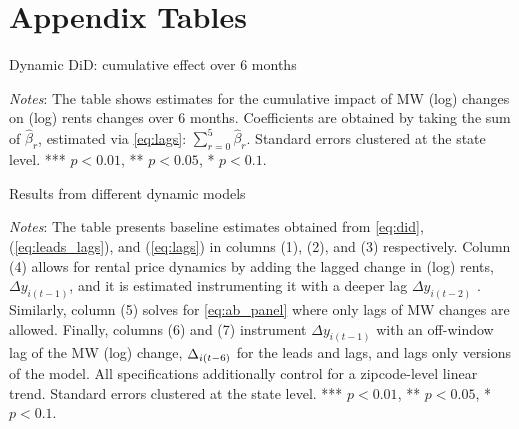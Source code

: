 
\section{Appendix Tables}

\begin{table}[h!]
	\caption{Dynamic DiD: cumulative effect over 6 months}
	\label{tab:dynamic_cumulative}
	\centering
	\resizebox{0.7\textwidth}{!}{
		\vspace{0pt}    
		
	}
	\begin{minipage}{.95\textwidth} \footnotesize
		\vspace{3mm} 
		\textit{Notes}: The table shows estimates for the cumulative impact of MW (log) changes 
		on (log) rents changes over 6 months. Coefficients are obtained by taking the sum of 
		$\hat{\beta}_{r}$, estimated via \autoref{eq:lags}: $\sum\limits_{r=0}^{5} \hat{\beta}_{r}$. 
		Standard errors clustered at the state level. *** $p < 0.01$, ** $p < 0.05$, * $p < 0.1$.   
	\end{minipage}
\end{table}

\clearpage
\begin{landscape}
	\begin{table}[h!]
	    \caption{Results from different dynamic models}
	    \label{tab:horse_race_main}
	    \centering
	    \resizebox{1.2\textwidth}{!}{
		    \vspace{0pt}    
		    
	    }
	    \begin{minipage}{1.15\textwidth} \footnotesize
			\vspace{3mm} 
			\textit{Notes}: The table presents baseline estimates obtained from \autoref{eq:did}, 
			(\ref{eq:leads_lags}), and (\ref{eq:lags}) in columns (1), (2), and (3) respectively. 
			Column (4) allows for rental price dynamics by adding the lagged change in (log) rents, 
			$\Delta y_{i(t-1)}$, and it is estimated instrumenting it with a deeper lag $\Delta 
			y_{i(t-2)}$ \parencite{arellano1991some}. Similarly, column (5) solves for 
			\autoref{eq:ab_panel} where only lags of MW changes are allowed. Finally, columns (6) and 
			(7) instrument $\Delta y_{i(t-1)}$ with an off-window lag of the MW (log) change, $\Delta 
			\title{MW}_{i(t-6)}$ for the leads and lags, and lags only versions of the model. All 
			specifications additionally control for a zipcode-level linear trend. Standard errors 
			clustered at the state level. *** $p < 0.01$, ** $p < 0.05$, * $p < 0.1$.   
		\end{minipage}
	\end{table}
\end{landscape}

